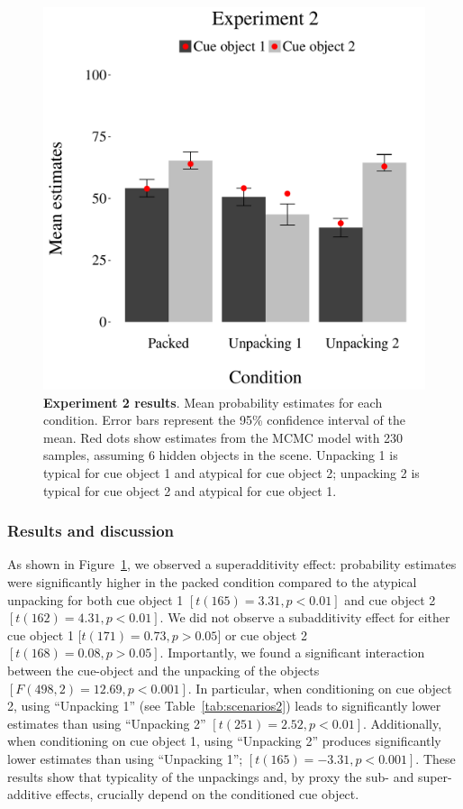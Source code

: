 \begin{figure}
\centering
\includegraphics[scale=0.5]{figures/estimate2new.pdf}
\caption{\textbf{Experiment 2 results}. Mean probability estimates for each condition. Error bars represent the 95\% confidence interval of the mean. Red dots show estimates from the MCMC model with 230 samples, assuming 6 hidden objects in the scene. Unpacking 1 is typical for cue object 1 and atypical for cue object 2; unpacking 2 is typical for cue object 2 and atypical for cue object 1.}
\label{fig:results2}
\end{figure}

\subsubsection{Results and discussion}
As shown in Figure~\ref{fig:results2}, we observed a superadditivity effect: probability estimates were significantly higher in the packed condition compared to the atypical unpacking for both cue object 1 $[t(165)=3.31, p<0.01]$ and cue object 2 $[t(162)=4.31, p<0.01]$. We did not observe a subadditivity effect for either cue object 1 [$t(171)=0.73, p>0.05]$ or cue object 2 $[t(168)=0.08, p>0.05]$. Importantly, we found a significant interaction between the cue-object and the unpacking of the objects $[F(498, 2)=12.69, p<0.001]$. In particular, when conditioning on cue object 2, using ``Unpacking 1'' (see Table~\ref{tab:scenarios2}) leads to significantly lower estimates than using ``Unpacking 2'' $[t(251)=2.52 , p<0.01]$. Additionally, when conditioning on cue object 1, using ``Unpacking 2'' produces significantly lower estimates than using ``Unpacking 1''; $[t(165)=-3.31, p<0.001]$. These results show that typicality of the unpackings and, by proxy the sub- and super-additive effects, crucially depend on the conditioned cue object.

